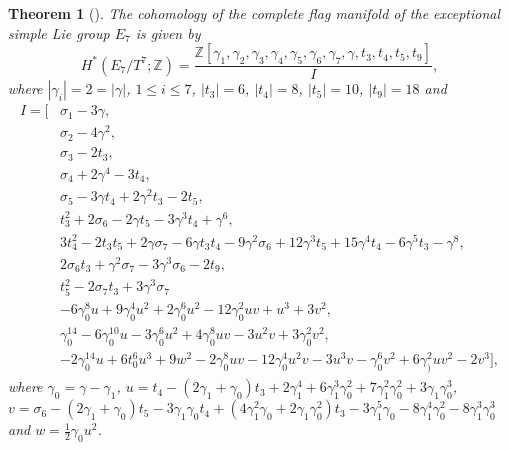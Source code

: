 \documentclass{article}
\theoremstyle{plain}
\newtheorem{thm}{Theorem}[section]
\theoremstyle{definition}
\numberwithin{thm}{section}
\begin{document}
		\begin{thm}[\cite{NakagawaE7}]\label{thm:H*E7/T}
			The cohomology of the complete flag manifold of the exceptional simple Lie group $E_7$ is given by
			\begin{equation*}
				H^*(E_7/T^7;\mathbb{Z})=\frac{\mathbb{Z}[\gamma_1,\gamma_2,\gamma_3,\gamma_4,\gamma_5,\gamma_6,\gamma_7,\gamma,t_3,t_4,t_5,t_9]}{I},
			\end{equation*}
			where $|\gamma_i|=2=|\gamma|$, $1\leq i \leq 7$, $|t_3|=6$, $|t_4|=8$, $|t_5|=10$, $|t_9|=18$ and
			\begin{align*}
				I=[
				&\sigma_1-3\gamma, \\
				&\sigma_2-4\gamma^2, \\
				&\sigma_3-2t_3, \\
				&\sigma_4+2\gamma^4-3t_4, \\
				&\sigma_5-3\gamma t_4+2\gamma^2t_3-2t_5, \\
				&t_3^2+2\sigma_6-2\gamma t_5-3\gamma^3t_4+\gamma^6, \\
				&3t_4^2-2t_3t_5+2\gamma \sigma_7-6\gamma t_3t_4-9\gamma^2\sigma_6+12\gamma^3t_5+15\gamma^4t_4-6\gamma^5t_3-\gamma^8, \\
				&2\sigma_6t_3+\gamma^2\sigma_7-3\gamma^3\sigma_6-2t_9, \\
				&t_5^2-2\sigma_7t_3+3\gamma^3\sigma_7 \\
				&-6\gamma_0^8u+9\gamma_0^4u^2+2\gamma^6_0u^2-12\gamma_0^2uv+u^3+3v^2, \\
				&\gamma_0^14-6\gamma_0^10u-3\gamma_0^6u^2+4\gamma^8_0uv-3u^2v+3\gamma_0^2v^2, \\
				&-2\gamma_0^14u+6t^6_0u^3+9w^2-2\gamma_0^8uv-12\gamma_0^4u^2v-3u^3v-\gamma_0^6v^2+6\gamma^2_)uv^2-2v^3
				],
			\end{align*}
			where $\gamma_0=\gamma-\gamma_1$, $u=t_4-(2\gamma_1+\gamma_0)t_3+2\gamma_1^4+6\gamma_1^3\gamma_0^2+7\gamma_1^2\gamma_0^2+3\gamma_1\gamma_0^3$, \\
			$v=\sigma_6-(2\gamma_1+\gamma_0)t_5-3\gamma_1\gamma_0t_4+(4\gamma_1^2\gamma_0+2\gamma_1\gamma_0^2)t_3-3\gamma_1^5\gamma_0-8\gamma_1^4\gamma_0^2-8\gamma_1^3\gamma_0^3$
			and $w=\frac{1}{2}\gamma_0u^2$.
		\end{thm}
		
\end{document}
